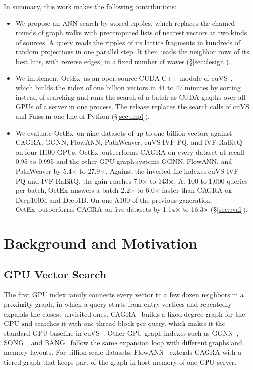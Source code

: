 \documentclass[letterpaper,twocolumn,10pt]{article}
\newcommand{\sysname}{OctEx}
\begin{document}
In summary, this work makes the following contributions:
\begin{itemize}
  \item We propose an ANN search by stored ripples, which replaces the chained rounds of graph walks with precomputed lists of nearest vectors at two kinds of sources. A query reads the ripples of its lattice fragments in hundreds of random projections in one parallel step. It then reads the neighbor rows of its best hits, with reverse edges, in a fixed number of waves (\S\ref{sec:design}).
  
  
  \item We implement \sysname\ as an open-source CUDA C++ module of cuVS~\cite{nvidia2025cuvs}, which builds the index of one billion vectors in 44 to 47 minutes by sorting instead of searching and runs the search of a batch as CUDA graphs over all GPUs of a server in one process. The release replaces the search calls of cuVS and Faiss in one line of Python (\S\ref{sec:impl}).
  
  \item We evaluate \sysname\ on nine datasets of up to one billion vectors against CAGRA, GGNN, FlowANN, PathWeaver, cuVS IVF-PQ, and IVF-RaBitQ on four H100 GPUs. \sysname\ outperforms CAGRA on every dataset at recall 0.95 to 0.995 and the other GPU graph systems GGNN, FlowANN, and PathWeaver by 5.4$\times$ to 27.9$\times$. Against the inverted file indexes cuVS IVF-PQ and IVF-RaBitQ, the gain reaches 7.0$\times$ to 343$\times$. At 100 to 1,000 queries per batch, \sysname\ answers a batch 2.2$\times$ to 6.0$\times$ faster than CAGRA on Deep100M and Deep1B. On one A100 of the previous generation, \sysname\ outperforms CAGRA on five datasets by 1.14$\times$ to 16.3$\times$ (\S\ref{sec:eval}).
\end{itemize}

\section{Background and Motivation}
\label{sec:motivation}

\subsection{GPU Vector Search}

The first GPU index family connects every vector to a few dozen neighbors in a proximity graph, in which a query starts from entry vertices and repeatedly expands the closest unvisited ones. CAGRA~\cite{ootomo2024cagra} builds a fixed-degree graph for the GPU and searches it with one thread block per query, which makes it the standard GPU baseline in cuVS~\cite{nvidia2025cuvs}. Other GPU graph indexes such as GGNN~\cite{groh2023ggnn}, SONG~\cite{zhao2020song}, and BANG~\cite{venkatasubba2025bang} follow the same expansion loop with different graphs and memory layouts. For billion-scale datasets, FlowANN~\cite{zhao2026flowann} extends CAGRA with a tiered graph that keeps part of the graph in host memory of one GPU server.
\end{document}
